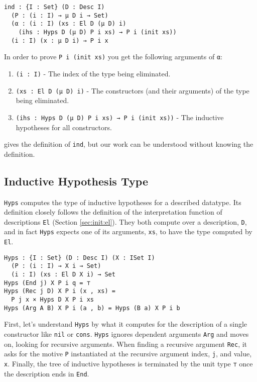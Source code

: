 \documentclass[preprint,nonatbib]{sigplanconf}
\newcommand{\refsec}[1]{Section \ref{sec:#1}}
\begin{document}
\begin{verbatim}
ind : {I : Set} (D : Desc I)
  (P : (i : I) → μ D i → Set)
  (α : (i : I) (xs : El D (μ D) i)
    (ihs : Hyps D (μ D) P i xs) → P i (init xs))
  (i : I) (x : μ D i) → P i x
\end{verbatim}

In order to prove {\tt P i (init xs)} you get the following
arguments of \verb+α+:

\begin{enumerate}
\item{{\tt (i : I)}} - The index of the type being eliminated.
\item{{\tt (xs : El D (μ D) i)}} - The constructors (and their arguments) of the type
  being eliminated.
\item{{\tt (ihs : Hyps D (μ D) P i xs) → P i (init xs))}} - The inductive
  hypotheses for all constructors.
\end{enumerate}

\citet{mcbride2010ornamental} gives the definition of {\tt ind}, but
our work can be understood without knowing the definition.

\subsection{Inductive Hypothesis Type}

{\tt Hyps} computes the type of inductive hypotheses for a described
datatype. Its definition closely follows the definition of
the interpretation function of descriptions {\tt El}
(\refsec{init:el}). They both compute over a description, {\tt D}, and in
fact {\tt Hyps} expects one of its arguments, {\tt xs}, to have the type
computed by {\tt El}.

\begin{verbatim}
Hyps : {I : Set} (D : Desc I) (X : ISet I)
  (P : (i : I) → X i → Set)
  (i : I) (xs : El D X i) → Set
Hyps (End j) X P i q = ⊤
Hyps (Rec j D) X P i (x , xs) =
  P j x × Hyps D X P i xs
Hyps (Arg A B) X P i (a , b) = Hyps (B a) X P i b
\end{verbatim}

First, let's understand {\tt Hyps} by what it computes for the
description of a single constructor like {\tt nil} or {\tt cons}.
{\tt Hyps} ignores dependent arguments {\tt Arg} and moves on, looking
for recursive arguments. When finding a recursive argument {\tt Rec}, it
asks for the motive {\tt P} instantiated at the recursive argument index, {\tt j}, and value, {\tt x}.
Finally, the tree of inductive hypotheses is terminated by the unit
type {\tt ⊤} once the description ends in {\tt End}.
\end{document}
